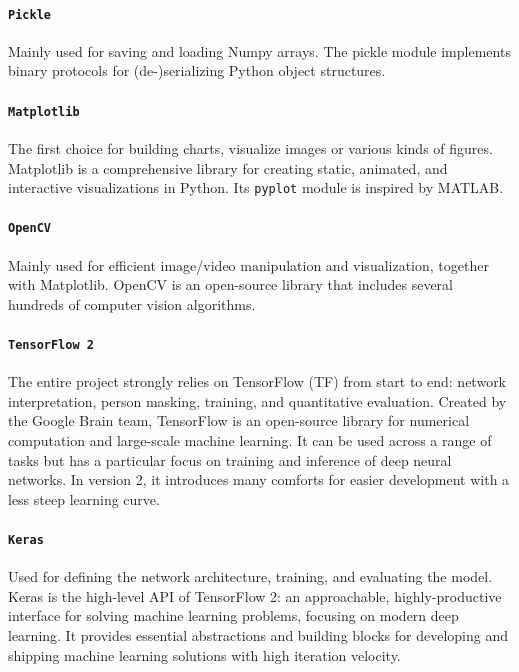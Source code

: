 \paragraph*{\texttt{Pickle}}
Mainly used for saving and loading Numpy arrays. The pickle module implements binary protocols for (de-)serializing Python object structures. 

\paragraph*{\texttt{Matplotlib}}
The first choice for building charts, visualize images or various kinds of figures. Matplotlib is a comprehensive library for creating static, animated, and interactive visualizations in Python. Its \texttt{pyplot} module is inspired by MATLAB.

\paragraph*{\texttt{OpenCV}}
Mainly used for efficient image/video manipulation and visualization, together with Matplotlib. OpenCV is an open-source library that includes several hundreds of computer vision algorithms.

\paragraph*{\texttt{TensorFlow 2}}
The entire project strongly relies on TensorFlow \cite{tensorflow} (TF) from start to end: network interpretation, person masking, training, and quantitative evaluation. Created by the Google Brain team, TensorFlow is an open-source library for numerical computation and large-scale machine learning. It can be used across a range of tasks but has a particular focus on training and inference of deep neural networks. In version 2, it introduces many comforts for easier development with a less steep learning curve.

\paragraph*{\texttt{Keras}}
Used for defining the network architecture, training, and evaluating the model. Keras  \cite{keras} is the high-level API of TensorFlow 2: an approachable, highly-productive interface for solving machine learning problems, focusing on modern deep learning. It provides essential abstractions and building blocks for developing and shipping machine learning solutions with high iteration velocity.


